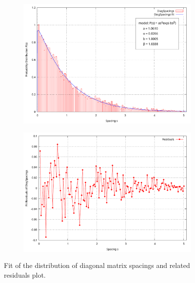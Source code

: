 \documentclass[11pt,a4paper]{article}
\begin{document}
\begin{figure}
	\centering
	\begin{subfigure}{0.9\textwidth}
		\includegraphics[width=1\linewidth]{Fit_DiagSpacings.pdf}
	\end{subfigure}
	\begin{subfigure}{0.9\textwidth}
		\includegraphics[width=1\linewidth]{Res_DiagSpacings.pdf}
	\end{subfigure}
	\caption{Fit of the distribution of diagonal matrix spacings and related residuals plot.}
	\label{fig:diag}
\end{figure}
\end{document}
